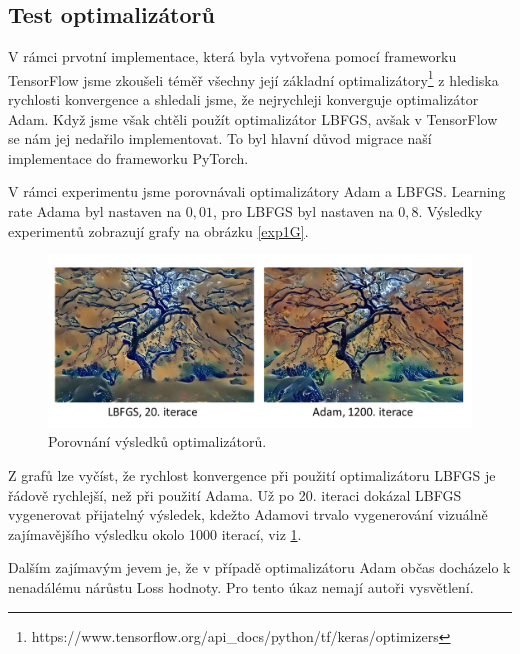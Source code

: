 \documentclass[twocolumn]{article}
\begin{document}
	\subsection*{Test optimalizátorů}
	V rámci prvotní implementace, která byla vytvořena pomocí frameworku TensorFlow jsme zkoušeli téměř všechny její základní optimalizátory\footnote{https://www.tensorflow.org/api\_docs/python/tf/keras/optimizers} z hlediska rychlosti konvergence a shledali jsme, že nejrychleji konverguje optimalizátor Adam. Když jsme však chtěli použít optimalizátor LBFGS, avšak v TensorFlow se nám jej nedařilo implementovat. To byl hlavní důvod migrace naší implementace do frameworku PyTorch.
	\par
	V rámci experimentu jsme porovnávali optimalizátory Adam a LBFGS. Learning rate Adama byl nastaven na $0,01$, pro LBFGS byl nastaven na $0,8$. Výsledky experimentů zobrazují grafy na obrázku \ref{exp1G}.
	
	\begin{figure}[h]
		\includegraphics[width=\linewidth]{LBFGS_ADAM_iterace.png}
		\caption{Porovnání výsledků optimalizátorů. }
		\label{Exp1O}
	\end{figure}
	
	

	Z grafů lze vyčíst, že rychlost konvergence při použití optimalizátoru LBFGS je řádově rychlejší, než při použití Adama. Už po 20. iteraci dokázal LBFGS vygenerovat přijatelný výsledek, kdežto Adamovi trvalo vygenerování vizuálně zajímavějšího výsledku okolo 1000 iterací, viz \ref{Exp1O}.

	 Dalším zajímavým jevem je, že v případě optimalizátoru Adam občas docházelo k nenadálému nárůstu Loss hodnoty. Pro tento úkaz nemají autoři vysvětlení.
	
\end{document}
